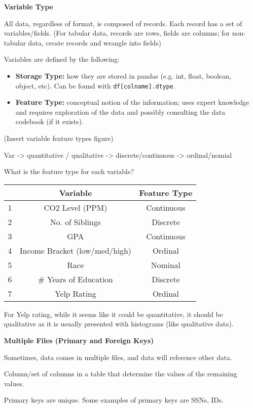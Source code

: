 \textbf{Variable Type}

All data, regardless of format, is composed of records. Each record has a set of variables/fields. (For tabular data, records are rows, fields are columns; for non-tabular data, create records and wrangle into fields)

Variables are defined by the following:
\begin{itemize}
    \item \textbf{Storage Type:} how they are stored in pandas (e.g. int, float, boolean, object, etc). Can be found with \texttt{df[colname].dtype}.
\item \textbf{Feature Type:} conceptual notion of the information; uses expert knowledge and requires exploration of the data and possibly consulting the data codebook (if it exists).
\end{itemize}

(Insert variable feature types figure)

Var -> quantitative / qualitative -> discrete/continuous -> ordinal/nomial

\begin{example}[]{What is the feature type for each variable?
\tcbline
\begin{center}
\begin{tabular}{@{}ccc@{}}
\toprule
     & Variable & Feature Type \\
\midrule
    1 & CO2 Level (PPM) & Continuous \\
    2 & No. of Siblings & Discrete \\
    3 & GPA & Continuous \\
    4 & Income Bracket (low/med/high) & Ordinal \\
    5 & Race & Nominal \\
    6 & \# Years of Education & Discrete \\
    7 & Yelp Rating & Ordinal \\
\bottomrule
\end{tabular}
\end{center}
For Yelp rating, while it seems like it could be quantitative, it should be qualitative as it is usually presented with histograms (like qualitative data).
}
\end{example}

\textbf{Multiple Files (Primary and Foreign Keys)}

Sometimes, data comes in multiple files, and data will reference other data.

\begin{definition}{Column/set of columns in a table that determine the values of the remaining values.

Primary keys are unique. Some examples of primary keys are SSNs, IDs.
}
\end{definition}

